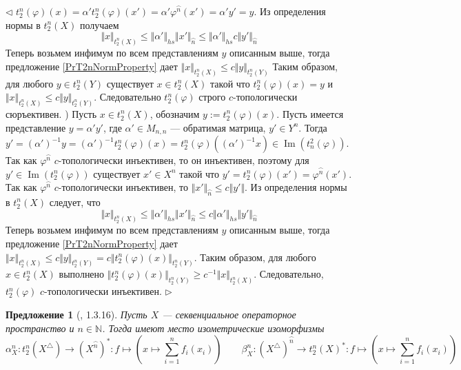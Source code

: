 \documentclass[12pt]{article}
\newtheorem{proposition}[theorem]{Предложение}
\newenvironment{proof}{\par $\triangleleft$}{$\triangleright$}
\begin{document}
\begin{proof}
$t_2^n(\varphi)(x)=\alpha't_2^n(\varphi)(x')=\alpha'\varphi^{\wideparen{n}}(x')=\alpha' y'=y$. Из определения нормы в $t_2^n(X)$ получаем
$$
\Vert x\Vert_{t_2^n(X)}
\leq\Vert\alpha'\Vert_{hs}\Vert x'\Vert_{\wideparen{n}}
\leq\Vert\alpha'\Vert_{hs} c\Vert y'\Vert_{\wideparen{n}}
$$
Теперь возьмем инфимум по всем представлениям $y$ описанным выше, тогда предложение \ref{PrT2nNormProperty} дает $\Vert x\Vert_{t_2^n(X)}\leq c\Vert y\Vert_{t_2^n(Y)}$
Таким образом, для любого $y\in t_2^n(Y)$ существует $x\in t_2^n(X)$ такой что $t_2^n(\varphi)(x)=y$ и $\Vert x\Vert_{t_2^n(X)}\leq c\Vert y\Vert_{t_2^n(Y)}$. Следовательно $t_2^n(\varphi)$ строго $c$-топологически сюръективен.
) Пусть $x\in t_2^n(X)$, обозначим $y:=t_2^n(\varphi)(x)$. Пусть имеется представление $y=\alpha' y'$, где $\alpha'\in M_{n,n}$ --- обратимая матрица, $y'\in Y^n$. Тогда 
$y'=(\alpha')^{-1}y=(\alpha')^{-1}t_2^n(\varphi)(x)=t_2^n(\varphi)((\alpha')^{-1}x)\in\operatorname{Im}(t_n^2(\varphi))
$. Так как $\varphi^{\wideparen{n}}$ $c$-топологически инъективен, то он инъективен, поэтому для $y'\in \operatorname{Im}(t_2^n(\varphi))$ существует $x'\in X^n$ такой что 
$y'=t_2^n(\varphi)(x')=\varphi^{\wideparen{n}}(x')$. Так как $\varphi^{\wideparen{n}}$ $c$-топологически инъективен, то $\Vert x'\Vert_{\wideparen{n}}\leq c\Vert y'\Vert$. Из определения нормы в $t_2^n(X)$ следует, что
$$
\Vert x\Vert_{t_2^n(X)}\leq\Vert\alpha'\Vert_{hs}\Vert x'\Vert_{\wideparen{n}}\leq c\Vert\alpha'\Vert_{hs}\Vert y'\Vert_{\wideparen{n}}
$$
Теперь возьмем инфимум по всем представлениям $y$ описанным выше, тогда предложение \ref{PrT2nNormProperty} дает $\Vert x\Vert_{t_2^n(X)}\leq c\Vert y\Vert_{t_2^n(Y)}=c\Vert t_2^n(\varphi)(x)\Vert_{t_2^n(Y)}$. 
Таким образом, для любого $x\in t_2^n(X)$ выполнено $\Vert t_2^n(\varphi)(x)\Vert_{t_2^n(Y)}\geq c^{-1}\Vert x\Vert_{t_2^n(X)}$. Следовательно, $t_2^n(\varphi)$ $c$-топологически инъективен.
\end{proof}

\begin{proposition}[\cite{LamOpFolgen}, 1.3.16]\label{PrT2nTraingDuality}
Пусть $X$ --- секвенциальное операторное пространство и $n\in\mathbb{N}$. Тогда имеют место изометрические изоморфизмы
$$
\alpha_X^n:t_2^n(X^\triangle)\to (X^{\wideparen{n}})^*: f\mapsto\left(x\mapsto\sum\limits_{i=1}^n f_i(x_i)\right)
\qquad
\beta_X^n:(X^\triangle)^{\wideparen{n}}\to t_2^n(X)^*:f\mapsto\left(x\mapsto\sum\limits_{i=1}^n f_i(x_i)\right)
$$
\end{proposition}
\end{document}
